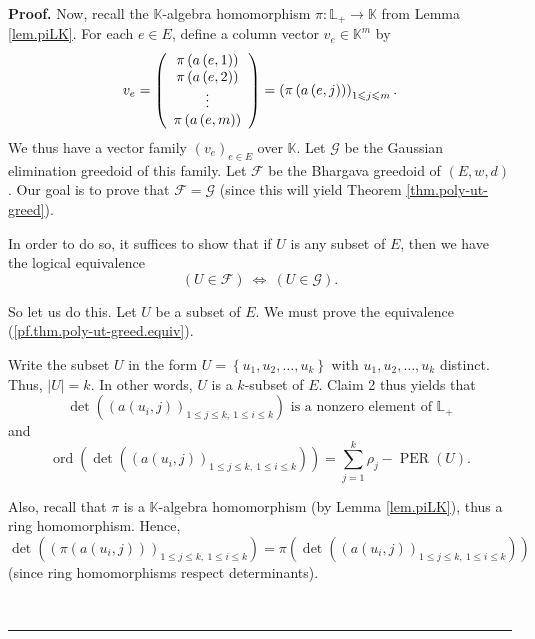 \documentclass[numbers=enddot,12pt,final,onecolumn,notitlepage]{scrartcl}%
\theoremstyle{definition}
\newenvironment{proof}[1][Proof]{\noindent\textbf{#1.} }{\ \rule{0.5em}{0.5em}}
\let\sumnonlimits\sum
\renewcommand{\sum}{\sumnonlimits\limits}
\renewcommand{\leq}{\leqslant}
\theoremstyle{plainsl}
\begin{document}
\begin{proof}
Now, recall the $\mathbb{K}$-algebra homomorphism $\pi:\mathbb{L}%
_{+}\rightarrow\mathbb{K}$ from Lemma \ref{lem.piLK}. For each $e\in E$,
define a column vector $v_{e}\in\mathbb{K}^{m}$ by%
\[
v_{e}=\left(
\begin{array}
[c]{c}%
\pi\left(  a\left(  e,1\right)  \right) \\
\pi\left(  a\left(  e,2\right)  \right) \\
\vdots\\
\pi\left(  a\left(  e,m\right)  \right)
\end{array}
\right)  =\left(  \pi\left(  a\left(  e,j\right)  \right)  \right)  _{1\leq
j\leq m}.
\]
We thus have a vector family $\left(  v_{e}\right)  _{e\in E}$ over
$\mathbb{K}$. Let $\mathcal{G}$ be the Gaussian elimination greedoid of this
family. Let $\mathcal{F}$ be the Bhargava greedoid of $\left(  E,w,d\right)
$. Our goal is to prove that $\mathcal{F}=\mathcal{G}$ (since this will yield
Theorem \ref{thm.poly-ut-greed}).

In order to do so, it suffices to show that if $U$ is any subset of $E$, then
we have the logical equivalence
\begin{equation}
\left(  U\in\mathcal{F}\right)  \ \Longleftrightarrow\ \left(  U\in
\mathcal{G}\right)  . \label{pf.thm.poly-ut-greed.equiv}%
\end{equation}


So let us do this. Let $U$ be a subset of $E$. We must prove the equivalence
(\ref{pf.thm.poly-ut-greed.equiv}).

Write the subset $U$ in the form $U=\left\{  u_{1},u_{2},\ldots,u_{k}\right\}
$ with $u_{1},u_{2},\ldots,u_{k}$ distinct. Thus, $\left\vert U\right\vert
=k$. In other words, $U$ is a $k$-subset of $E$. Claim 2 thus yields that%
\begin{equation}
\det\left(  \left(  a\left(  u_{i},j\right)  \right)  _{1\leq j\leq k,\ 1\leq
i\leq k}\right)  \text{ is a nonzero element of }\mathbb{L}_{+}
\label{pf.thm.poly-ut-greed.equiv.pf.1}%
\end{equation}
and%
\begin{equation}
\operatorname*{ord}\left(  \det\left(  \left(  a\left(  u_{i},j\right)
\right)  _{1\leq j\leq k,\ 1\leq i\leq k}\right)  \right)  =\sum_{j=1}^{k}%
\rho_{j}-\operatorname*{PER}\left(  U\right)  .
\label{pf.thm.poly-ut-greed.equiv.pf.2}%
\end{equation}


Also, recall that $\pi$ is a $\mathbb{K}$-algebra homomorphism (by Lemma
\ref{lem.piLK}), thus a ring homomorphism. Hence,%
\begin{equation}
\det\left(  \left(  \pi\left(  a\left(  u_{i},j\right)  \right)  \right)
_{1\leq j\leq k,\ 1\leq i\leq k}\right)  =\pi\left(  \det\left(  \left(
a\left(  u_{i},j\right)  \right)  _{1\leq j\leq k,\ 1\leq i\leq k}\right)
\right)  \label{pf.thm.poly-ut-greed.equiv.pf.3}%
\end{equation}
(since ring homomorphisms respect determinants).


\end{proof}
\end{document}
